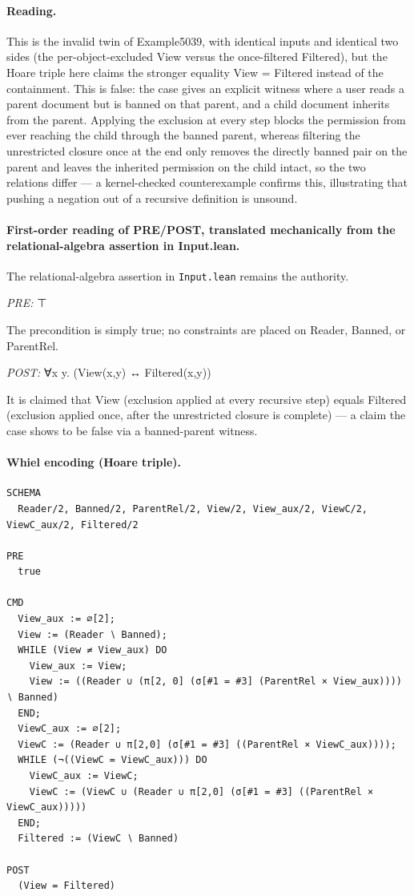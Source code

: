 \documentclass[10pt]{article}
\begin{document}
\paragraph{Reading.} This is the invalid twin of Example5039, with identical inputs and identical two sides (the per-object-excluded View versus the once-filtered Filtered), but the Hoare triple here claims the stronger equality View = Filtered instead of the containment. This is false: the case gives an explicit witness where a user reads a parent document but is banned on that parent, and a child document inherits from the parent. Applying the exclusion at every step blocks the permission from ever reaching the child through the banned parent, whereas filtering the unrestricted closure once at the end only removes the directly banned pair on the parent and leaves the inherited permission on the child intact, so the two relations differ --- a kernel-checked counterexample confirms this, illustrating that pushing a negation out of a recursive definition is unsound.

\paragraph{First-order reading of PRE/POST, translated mechanically from the relational-algebra assertion in Input.lean.} The relational-algebra assertion in \texttt{Input.lean} remains the authority.

\textit{PRE:} ⊤\par The precondition is simply true; no constraints are placed on Reader, Banned, or ParentRel.

\textit{POST:} ∀x y. (View(x,y) ↔ Filtered(x,y))\par It is claimed that View (exclusion applied at every recursive step) equals Filtered (exclusion applied once, after the unrestricted closure is complete) --- a claim the case shows to be false via a banned-parent witness.

\paragraph{Whiel encoding (Hoare triple).}

\begin{Verbatim}[fontsize=\scriptsize,breaklines=true,breakanywhere=true,frame=single,framesep=1.5mm]
SCHEMA
  Reader/2, Banned/2, ParentRel/2, View/2, View_aux/2, ViewC/2, ViewC_aux/2, Filtered/2

PRE
  true

CMD
  View_aux := ∅[2];
  View := (Reader ∖ Banned);
  WHILE (View ≠ View_aux) DO
    View_aux := View;
    View := ((Reader ∪ (π[2, 0] (σ[#1 = #3] (ParentRel × View_aux)))) ∖ Banned)
  END;
  ViewC_aux := ∅[2];
  ViewC := (Reader ∪ π[2,0] (σ[#1 = #3] ((ParentRel × ViewC_aux))));
  WHILE (¬((ViewC = ViewC_aux))) DO
    ViewC_aux := ViewC;
    ViewC := (ViewC ∪ (Reader ∪ π[2,0] (σ[#1 = #3] ((ParentRel × ViewC_aux)))))
  END;
  Filtered := (ViewC ∖ Banned)

POST
  (View = Filtered)
\end{Verbatim}
\end{document}
